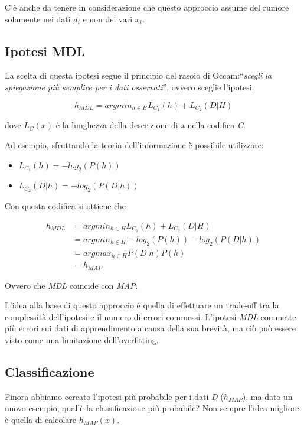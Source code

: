 C'è anche da tenere in considerazione che questo approccio assume del rumore solamente nei dati $d_i$ e non dei vari $x_i$.

\subsection{Ipotesi MDL}

La scelta di questa ipotesi segue il principio del rasoio di Occam:``\textit{scegli la spiegazione più semplice per i dati osservati}'', ovvero sceglie l'ipotesi:

$$
h_{MDL} = argmin_{h \in H} L_{C_1}(h) + L_{C_2}(D|H)
$$

dove $L_C(x)$ è la lunghezza della descrizione di \textit{x} nella codifica \textit{C}.

Ad esempio, sfruttando la teoria dell'informazione è possibile utilizzare:

\begin{itemize}
\item $L_{C_1}(h) = - log_2(P(h))$
\item $L_{C_2}(D|h) = - log_2(P(D|h))$
\end{itemize}

Con questa codifica si ottiene che

\begin{align*}
h_{MDL} 	&= argmin_{h \in H} L_{C_1}(h) + L_{C_2}(D|H) \\
				&= argmin_{h \in H} - log_2(P(h)) - log_2(P(D|h)) \\
				&= argmax_{h \in H} P(D|h)P(h) \\
				&= h_{MAP}
\end{align*}

Ovvero che \textit{MDL} coincide con \textit{MAP}.

L'idea alla base di questo approccio è quella di effettuare un trade-off tra la complessità dell'ipotesi e il numero di errori commessi. L'ipotesi \textit{MDL} commette più errori sui dati di apprendimento a causa della sua brevità, ma ciò può essere visto come una limitazione dell'overfitting.

\subsection{Classificazione}\label{classificazione}

Finora abbiamo cercato l'ipotesi più probabile per i dati \emph{D}
($h_{MAP}$), ma dato un nuovo esempio, qual'è la classificazione più
probabile? Non sempre l'idea migliore è quella di calcolare $h_{MAP}(x)$.

